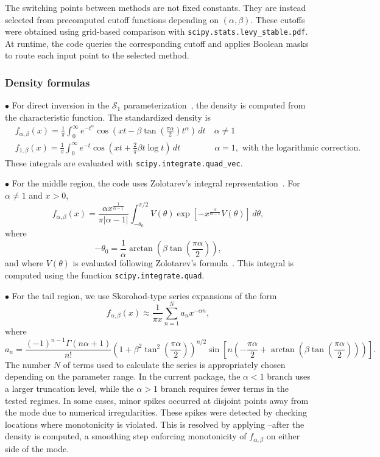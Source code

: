 The switching points between methods are not fixed constants. They are instead selected from precomputed cutoff functions depending on $(\alpha,\beta)$. These cutoffs were obtained using grid-based comparison with \texttt{scipy.stats.levy\_stable.pdf}. At runtime, the code queries the corresponding cutoff and applies Boolean masks to route each input point to the selected method.

\subsubsection*{Density formulas}

$\bullet$ For direct inversion in the $\mathcal{S}_1$ parameterization~\citep{NolanJohnP2020USDM}, the density is computed from the characteristic function. The standardized density is
\begin{align*}
    & f_{\alpha,\beta}(x) = \frac{1}{\pi} \int_0^\infty e^{-t^\alpha} \cos\left( xt-\beta\tan\left(\frac{\pi\alpha}{2}\right)t^\alpha\right) \,dt
    \quad \alpha \neq 1 \\
    & f_{1,\beta}(x) = \frac{1}{\pi} \int_0^\infty e^{-t} \cos\left( xt+\frac{2}{\pi}\beta t\log t \right) \,dt
    \qquad \qquad \alpha = 1, \text{ with the logarithmic correction.}
\end{align*}
These integrals are evaluated with \texttt{scipy.integrate.quad\_vec}.



\noindent
$\bullet$ For the middle region, the code uses Zolotarev's integral representation~\citep{Zolotarev1986}. For $\alpha\neq1$ and $x>0$,
\[
f_{\alpha,\beta}(x) = \frac{\alpha x^{\frac{1}{\alpha-1}}} {\pi |\alpha-1|}
\int_{-\theta_0}^{\pi/2} V(\theta) \exp\left[ -x^{\frac{\alpha}{\alpha-1}}V(\theta)\right]\,d\theta,
\]
where
\[
-\theta_0= \frac{1}{\alpha}\arctan\left(\beta\tan\left(\frac{\pi\alpha}{2}\right)\right),
\]
and where $V(\theta)$ is evaluated following Zolotarev's formula~\citep{Zolotarev1986}. This integral is computed using the function \texttt{scipy.integrate.quad}.



\noindent
$\bullet$ For the tail region, we use Skorohod-type series expansions \citep{sko2, Wintner1941CauchySingularities, Pollard1946LaplaceIntegral} of the form
\[
f_{\alpha,\beta}(x) \approx \frac{1}{\pi x} \sum_{n=1}^{N} a_n x^{-\alpha n},
\]
where
\[
a_n = \frac{(-1)^{n-1}\Gamma(n\alpha+1)}{n!} \left( 1+\beta^2\tan^2\left(\frac{\pi\alpha}{2}\right) \right)^{n/2} \sin\left[n\left(
-\frac{\pi\alpha}{2} + \arctan\left( \beta\tan\left(\frac{\pi\alpha}{2}\right) \right) \right) \right].
\]
The number $N$ of terms used to calculate the series is appropriately chosen depending on the parameter range. In the current package, the $\alpha<1$ branch uses a larger truncation level, while the $\alpha>1$ branch requires fewer terms in the tested regimes.
In some cases, minor spikes occurred at disjoint points away from the mode due to numerical irregularities. These spikes were detected by checking locations where monotonicity is violated. This is resolved by applying --after the density is computed, a smoothing step enforcing monotonicity of $f_{\alpha,\beta}$ on either side of the mode.

